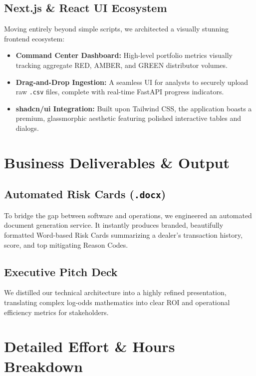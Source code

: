 \documentclass[11pt, a4paper]{article}
\begin{document}
\subsection{Next.js \& React UI Ecosystem}
Moving entirely beyond simple scripts, we architected a visually stunning frontend ecosystem:
\begin{itemize}[leftmargin=*, label=\textcolor{accentcyan}{}]
    \item \textbf{Command Center Dashboard:} High-level portfolio metrics visually tracking aggregate RED, AMBER, and GREEN distributor volumes.
    \item \textbf{Drag-and-Drop Ingestion:} A seamless UI for analysts to securely upload raw \texttt{.csv} files, complete with real-time FastAPI progress indicators.
    \item \textbf{shadcn/ui Integration:} Built upon Tailwind CSS, the application boasts a premium, glassmorphic aesthetic featuring polished interactive tables and dialogs.
\end{itemize}

\section{Business Deliverables \& Output}

\subsection{Automated Risk Cards (\texttt{.docx})}
To bridge the gap between software and operations, we engineered an automated document generation service. It instantly produces branded, beautifully formatted Word-based Risk Cards summarizing a dealer's transaction history, score, and top mitigating Reason Codes.

\subsection{Executive Pitch Deck}
We distilled our technical architecture into a highly refined presentation, translating complex log-odds mathematics into clear ROI and operational efficiency metrics for stakeholders.

\section{Detailed Effort \& Hours Breakdown}
\end{document}
